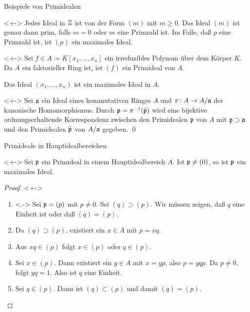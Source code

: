 \begin{frame}{Beispiele von Primidealen}
    \begin{example}<+->
        Jedes Ideal in \(\mathbb Z\) ist von der Form \((m)\) mit \(m \ge 0\). Das 
        Ideal \((m)\) ist genau dann prim, falls \(m = 0\) oder \(m\) eine Primzahl
        ist. Im Falle, daß \(p\) eine Primzahl ist, ist \((p)\) ein maximales Ideal.
    \end{example}
    \begin{example}<+->
        Sei \(f \in A \coloneqq K[x_1, \dotsc, x_n]\) ein irreduzibles Polynom über
        dem Körper \(K\). Da \(A\) ein faktorieller Ring ist, ist \((f)\) ein 
        Primideal von \(A\).
        
        Das Ideal \((x_1, \dotsc, x_n)\) ist ein maximales Ideal in \(A\).
    \end{example}
    \begin{proposition}<+->
        Sei \(\mathfrak{a}\) ein Ideal eines kommutativen Ringes \(A\) und
        \(\pi\colon A \to A/\mathfrak{a}\) der kanonische Homomorphismus.
        Durch \(\mathfrak{p} = \pi^{-1}(\bar{\mathfrak{p}})\) wird eine bijektive 
        ordnungserhaltende Korrespondenz zwischen den Primidealen \(\mathfrak{p}\)
        von \(A\) mit \(\mathfrak{p} \supset \mathfrak{a}\) und den Primidealen
        \(\bar{\mathfrak{p}}\) von \(A/\mathfrak{a}\) gegeben.
        \qed
    \end{proposition}
\end{frame}

\begin{frame}{Primideale in Hauptidealbereichen}
    \begin{proposition}<+->
        Sei \(\mathfrak{p}\) ein Primideal in einem Hauptidealbereich \(A\). Ist
        \(\mathfrak{p} \neq (0)\), so ist \(\mathfrak{p}\) ein maximales Ideal.
    \end{proposition}
    \begin{proof}<+->
        \begin{enumerate}[<+->]
        \item<.->
            Sei \(\mathfrak{p} = (p)\) mit \(p \neq 0\). Sei \((q) \supset (p)\). Wir
            müssen zeigen, daß \(q\) eine Einheit ist oder daß \((q) = (p)\).
        \item
            Da \((q) \supset (p)\), existiert ein \(x \in A\) mit \(p = x q\).
        \item
            Aus \(x q \in (p)\) folgt \(x \in (p)\) oder \(q \in (p)\).
        \item
            Sei \(x \in (p)\). Dann existiert ein \(y \in A\) mit \(x = y p\), also
            \(p = y q p\). Da \(p \neq 0\), folgt \(y q = 1\). Also ist \(q\) eine
            Einheit.
        \item
            Sei \(q \in (p)\). Dann ist \((q) \subset (p)\) und damit \((q) = (p)\).
            \qedhere
        \end{enumerate}
    \end{proof}
\end{frame}

